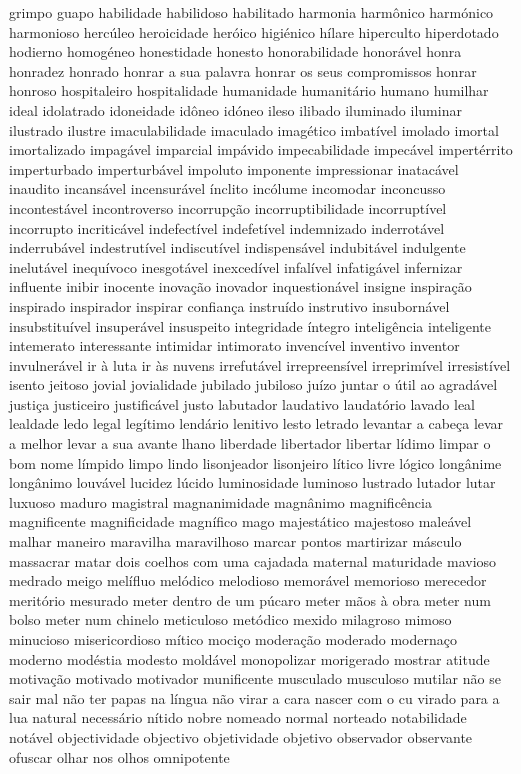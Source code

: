 \documentclass[ruledheader]{abnt_UFF}
\begin{document}
grimpo guapo habilidade habilidoso habilitado harmonia harm\^{o}nico harm\'{o}nico harmonioso herc\'{u}leo heroicidade her\'{o}ico higi\'{e}nico h\'{i}lare hiperculto hiperdotado hodierno homog\'{e}neo honestidade honesto honorabilidade honor\'{a}vel honra honradez honrado honrar a sua palavra honrar os seus compromissos honrar honroso hospitaleiro hospitalidade humanidade humanit\'{a}rio humano humilhar ideal idolatrado idoneidade id\^{o}neo id\'{o}neo ileso ilibado iluminado iluminar ilustrado ilustre imaculabilidade imaculado imag\'{e}tico imbat\'{i}vel imolado imortal imortalizado impag\'{a}vel imparcial imp\'{a}vido impecabilidade impec\'{a}vel impert\'{e}rrito imperturbado imperturb\'{a}vel impoluto imponente impressionar inatac\'{a}vel inaudito incans\'{a}vel incensur\'{a}vel \'{i}nclito inc\'{o}lume incomodar inconcusso incontest\'{a}vel incontroverso incorrup\c{c}\~ao incorruptibilidade incorrupt\'{i}vel incorrupto incritic\'{a}vel indefect\'{i}vel indefet\'{i}vel indemnizado inderrot\'{a}vel inderrub\'{a}vel indestrut\'{i}vel indiscut\'{i}vel indispens\'{a}vel indubit\'{a}vel indulgente inelut\'{a}vel inequ\'{i}voco inesgot\'{a}vel inexced\'{i}vel infal\'{i}vel infatig\'{a}vel infernizar influente inibir inocente inova\c{c}\~ao inovador inquestion\'{a}vel insigne inspira\c{c}\~ao inspirado inspirador inspirar confian\c{c}a instru\'{i}do instrutivo insuborn\'{a}vel insubstitu\'{i}vel insuper\'{a}vel insuspeito integridade \'{i}ntegro intelig\^{e}ncia inteligente intemerato interessante intimidar intimorato invenc\'{i}vel inventivo inventor invulner\'{a}vel ir \`{a} luta ir \`{a}s nuvens irrefut\'{a}vel irrepreens\'{i}vel irreprim\'{i}vel irresist\'{i}vel isento jeitoso jovial jovialidade jubilado jubiloso ju\'{i}zo juntar o \'{u}til ao agrad\'{a}vel justi\c{c}a justiceiro justific\'{a}vel justo labutador laudativo laudat\'{o}rio lavado leal lealdade ledo legal leg\'{i}timo lend\'{a}rio lenitivo lesto letrado levantar a cabe\c{c}a levar a melhor levar a sua avante lhano liberdade libertador libertar l\'{i}dimo limpar o bom nome l\'{i}mpido limpo lindo lisonjeador lisonjeiro l\'{i}tico livre l\'{o}gico long\^{a}nime long\^{a}nimo louv\'{a}vel lucidez l\'{u}cido luminosidade luminoso lustrado lutador lutar luxuoso maduro magistral magnanimidade magn\^{a}nimo magnific\^{e}ncia magnificente magnificidade magn\'{i}fico mago majest\'{a}tico majestoso male\'{a}vel malhar maneiro maravilha maravilhoso marcar pontos martirizar m\'{a}sculo massacrar matar dois coelhos com uma cajadada maternal maturidade mavioso medrado meigo mel\'{i}fluo mel\'{o}dico melodioso memor\'{a}vel memorioso merecedor merit\'{o}rio mesurado meter dentro de um p\'{u}caro meter m\~aos \`{a} obra meter num bolso meter num chinelo meticuloso met\'{o}dico mexido milagroso mimoso minucioso misericordioso m\'{i}tico moci\c{c}o modera\c{c}\~ao moderado moderna\c{c}o moderno mod\'{e}stia modesto mold\'{a}vel monopolizar morigerado mostrar atitude motiva\c{c}\~ao motivado motivador munificente musculado musculoso mutilar n\~ao se sair mal n\~ao ter papas na l\'{i}ngua n\~ao virar a cara nascer com o cu virado para a lua natural necess\'{a}rio n\'{i}tido nobre nomeado normal norteado notabilidade not\'{a}vel objectividade objectivo objetividade objetivo observador observante ofuscar olhar nos olhos omnipotente 
\end{document}
